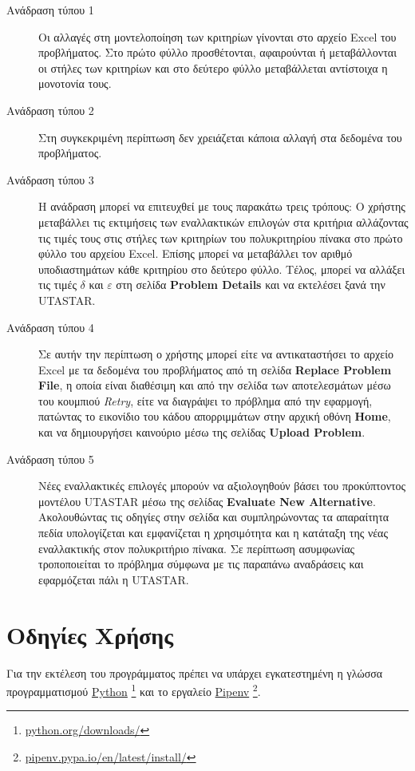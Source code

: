 \documentclass[11pt,a4paper,titlepage]{article}
\numberwithin{equation}{section}
\begin{document}
\begin{description}
	\item[Ανάδραση τύπου 1]
	Οι αλλαγές στη μοντελοποίηση των κριτηρίων γίνονται στο αρχείο Excel του προβλήματος. Στο πρώτο φύλλο προσθέτονται, αφαιρούνται ή μεταβάλλονται οι στήλες των κριτηρίων και στο δεύτερο φύλλο μεταβάλλεται αντίστοιχα η μονοτονία τους.
	\item[Ανάδραση τύπου 2]
	Στη συγκεκριμένη περίπτωση δεν χρειάζεται κάποια αλλαγή στα δεδομένα του προβλήματος.
	\item[Ανάδραση τύπου 3]
    Η ανάδραση μπορεί να επιτευχθεί με τους παρακάτω τρεις τρόπους: Ο χρήστης μεταβάλλει τις εκτιμήσεις των εναλλακτικών επιλογών στα κριτήρια αλλάζοντας τις τιμές τους στις στήλες των κριτηρίων του πολυκριτηρίου πίνακα στο πρώτο φύλλο του αρχείου Excel. Επίσης μπορεί να μεταβάλλει τον αριθμό υποδιαστημάτων κάθε κριτηρίου στο δεύτερο φύλλο. Τέλος, μπορεί να αλλάξει τις τιμές $ \delta $ και $ \varepsilon $ στη σελίδα \textbf{Problem Details} και να εκτελέσει ξανά την UTASTAR.
	\item[Ανάδραση τύπου 4]
    Σε αυτήν την περίπτωση ο χρήστης μπορεί είτε να αντικαταστήσει το αρχείο Excel με τα δεδομένα του προβλήματος από τη σελίδα \textbf{Replace Problem File}, η οποία είναι διαθέσιμη και από την σελίδα των αποτελεσμάτων μέσω του κουμπιού \textit{Retry}, είτε να διαγράψει το πρόβλημα από την εφαρμογή, πατώντας το εικονίδιο του κάδου απορριμμάτων στην αρχική οθόνη \textbf{Home}, και να δημιουργήσει καινούριο μέσω της σελίδας \textbf{Upload Problem}.
	\item[Ανάδραση τύπου 5]
	Νέες εναλλακτικές επιλογές μπορούν να αξιολογηθούν βάσει του προκύπτοντος μοντέλου UTASTAR μέσω της σελίδας \textbf{Evaluate New Alternative}. Ακολουθώντας τις οδηγίες στην σελίδα και συμπληρώνοντας τα απαραίτητα πεδία υπολογίζεται και εμφανίζεται η χρησιμότητα και η κατάταξη της νέας εναλλακτικής στον πολυκριτήριο πίνακα. Σε περίπτωση ασυμφωνίας τροποποιείται το πρόβλημα σύμφωνα με τις παραπάνω αναδράσεις και εφαρμόζεται πάλι η UTASTAR.
\end{description}

\section{Οδηγίες Χρήσης}
\label{sec:instructions}

Για την εκτέλεση του προγράμματος πρέπει να υπάρχει εγκατεστημένη η γλώσσα προγραμματισμού \href{https://www.python.org/downloads/}{Python}
\footnote{\href {https://www.python.org/downloads/}{python.org/downloads/}} και το εργαλείο \href{https://pipenv.pypa.io/en/latest/install/}{Pipenv}
\footnote{\href {https://pipenv.pypa.io/en/latest/install/}{pipenv.pypa.io/en/latest/install/}}.
\end{document}
